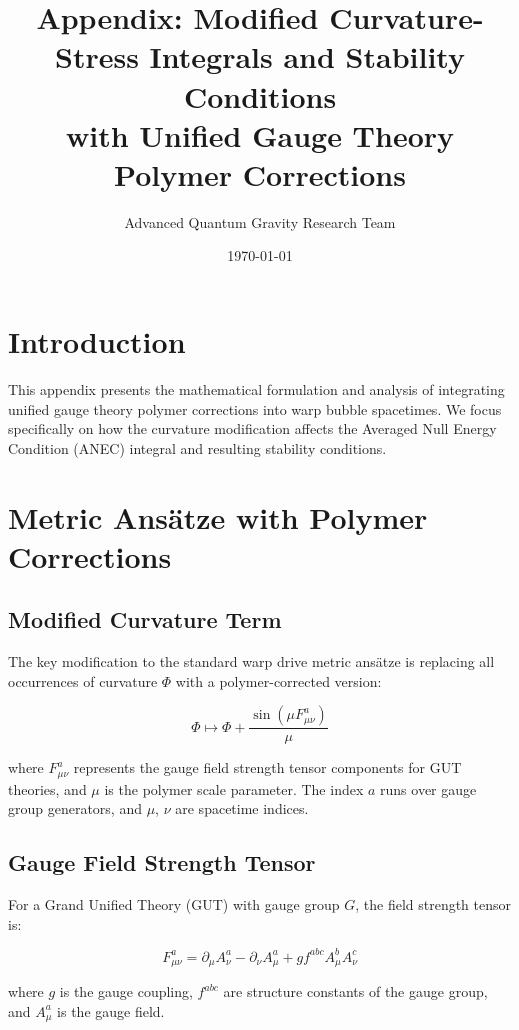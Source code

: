 \documentclass[11pt]{article}
\title{Appendix: Modified Curvature-Stress Integrals and Stability Conditions\\
with Unified Gauge Theory Polymer Corrections}
\author{Advanced Quantum Gravity Research Team}
\date{\today}
\begin{document}
\maketitle

\section{Introduction}

This appendix presents the mathematical formulation and analysis of integrating unified gauge theory polymer corrections into warp bubble spacetimes. We focus specifically on how the curvature modification affects the Averaged Null Energy Condition (ANEC) integral and resulting stability conditions.

\section{Metric Ansätze with Polymer Corrections}

\subsection{Modified Curvature Term}

The key modification to the standard warp drive metric ansätze is replacing all occurrences of curvature $\Phi$ with a polymer-corrected version:

\begin{equation}
\Phi \mapsto \Phi + \frac{\sin(\mu F^a_{\mu\nu})}{\mu}
\end{equation}

where $F^a_{\mu\nu}$ represents the gauge field strength tensor components for GUT theories, and $\mu$ is the polymer scale parameter. The index $a$ runs over gauge group generators, and $\mu$, $\nu$ are spacetime indices.

\subsection{Gauge Field Strength Tensor}

For a Grand Unified Theory (GUT) with gauge group $G$, the field strength tensor is:

\begin{equation}
F^a_{\mu\nu} = \partial_\mu A^a_\nu - \partial_\nu A^a_\mu + g f^{abc} A^b_\mu A^c_\nu
\end{equation}

where $g$ is the gauge coupling, $f^{abc}$ are structure constants of the gauge group, and $A^a_\mu$ is the gauge field.
\end{document}
